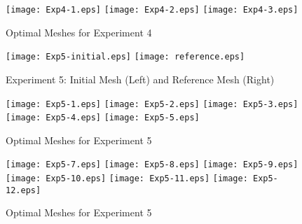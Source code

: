 \documentclass[letter]{report}
\begin{document}
\begin{figure}[!h]
\caption{Optimal Meshes for Experiment 4}
\texttt{[image: Exp4-1.eps]}
\texttt{[image: Exp4-2.eps]}
\texttt{[image: Exp4-3.eps]}
\end{figure}

\begin{figure}[!h]
\caption{Experiment 5: Initial Mesh (Left) and Reference Mesh (Right)}
\texttt{[image: Exp5-initial.eps]}
\texttt{[image: reference.eps]}
\end{figure}

\begin{figure}[!h]
\caption{Optimal Meshes for Experiment 5}
\texttt{[image: Exp5-1.eps]}
\texttt{[image: Exp5-2.eps]}
\texttt{[image: Exp5-3.eps]}
\texttt{[image: Exp5-4.eps]}
\texttt{[image: Exp5-5.eps]}
\end{figure}

\begin{figure}[!h]
\caption{Optimal Meshes for Experiment 5}
\texttt{[image: Exp5-7.eps]}
\texttt{[image: Exp5-8.eps]}
\texttt{[image: Exp5-9.eps]}
\texttt{[image: Exp5-10.eps]}
\texttt{[image: Exp5-11.eps]}
\texttt{[image: Exp5-12.eps]}
\end{figure}
\end{document}
